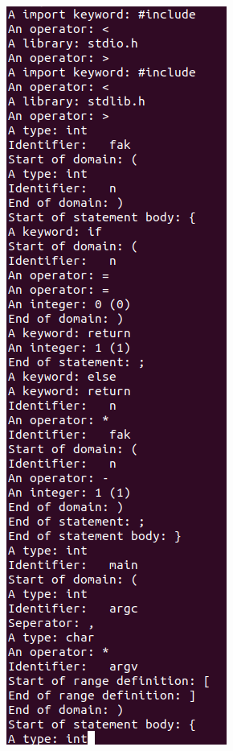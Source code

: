 \begin{multicols}{2}
\begin{figure}
    \includegraphics[width=\linewidth]{bilder/flex1.png}
    \label{fig:flex}
\end{figure}


\end{multicols}
